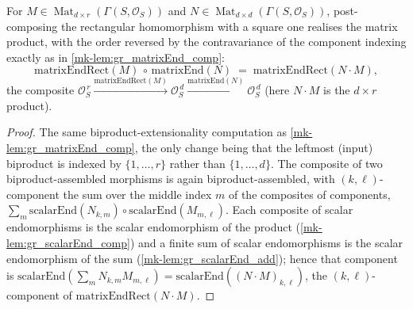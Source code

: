 \begin{lemma}\label{mk-lem:gr_matrixEndRect_comp}
  \leanok

  For \(M \in \operatorname{Mat}_{d\times r}(\Gamma(S,\mathcal{O}_S))\) and
  \(N \in \operatorname{Mat}_{d\times d}(\Gamma(S,\mathcal{O}_S))\), post-composing the
  rectangular homomorphism with a square one realises the matrix product, with the order
  reversed by the contravariance of the component indexing exactly as in
  \ref{mk-lem:gr_matrixEnd_comp}:
  \[
    \mathrm{matrixEndRect}(M) \,\circ\, \mathrm{matrixEnd}(N)
      \;=\; \mathrm{matrixEndRect}(N \cdot M),
  \]
  the composite \(\mathcal{O}_S^{\,r} \xrightarrow{\mathrm{matrixEndRect}(M)}
  \mathcal{O}_S^{\,d} \xrightarrow{\mathrm{matrixEnd}(N)} \mathcal{O}_S^{\,d}\) (here
  \(N \cdot M\) is the \(d \times r\) product).
\end{lemma}
\begin{proof}
  The same biproduct-extensionality computation as \ref{mk-lem:gr_matrixEnd_comp}, the only
  change being that the leftmost (input) biproduct is indexed by \(\{1,\dots,r\}\) rather
  than \(\{1,\dots,d\}\). The composite of two biproduct-assembled morphisms is again
  biproduct-assembled, with \((k,\ell)\)-component the sum over the middle index \(m\) of the
  composites of components, \(\sum_m \mathrm{scalarEnd}(N_{k,m}) \circ
  \mathrm{scalarEnd}(M_{m,\ell})\). Each composite of scalar endomorphisms is the scalar
  endomorphism of the product (\ref{mk-lem:gr_scalarEnd_comp}) and a finite sum of scalar
  endomorphisms is the scalar endomorphism of the sum (\ref{mk-lem:gr_scalarEnd_add}); hence
  that component is \(\mathrm{scalarEnd}(\sum_m N_{k,m} M_{m,\ell}) =
  \mathrm{scalarEnd}((N\cdot M)_{k,\ell})\), the \((k,\ell)\)-component of
  \(\mathrm{matrixEndRect}(N\cdot M)\).
\end{proof}

